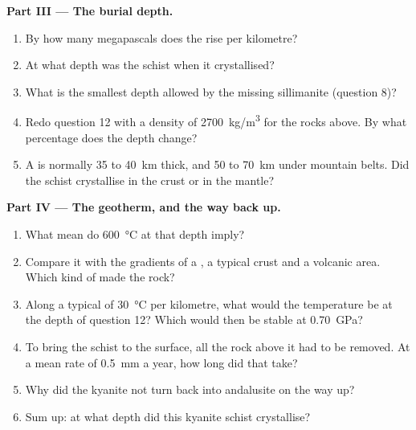 \begin{problem}
\medskip
\noindent\textbf{Part III --- The burial depth.}
\begin{enumerate}[resume]
  \item By how many megapascals does the  rise per
        kilometre?
  \item At what depth was the schist when it crystallised?
  \item What is the smallest depth allowed by the missing sillimanite
        (question 8)?
  \item Redo question 12 with a density of \qty{2700}{kg/m^3} for the rocks
        above. By what percentage does the depth change?
  \item A  is normally 35 to \qty{40}{km} thick, and 50 to
        \qty{70}{km} under mountain belts. Did the schist crystallise in the
        crust or in the mantle?
\end{enumerate}

\medskip
\noindent\textbf{Part IV --- The geotherm, and the way back up.}
\begin{enumerate}[resume]
  \item What mean  do \qty{600}{\celsius} at that depth
        imply?
  \item Compare it with the gradients of a , a typical
        crust and a volcanic area. Which kind of  made the rock?
  \item Along a typical  of \qty{30}{\celsius} per kilometre, what
        would the temperature be at the depth of question 12? Which
         would then be stable at \qty{0.70}{GPa}?
  \item To bring the schist to the surface, all the rock above it had to be
        removed. At a mean rate of \qty{0.5}{mm} a year, how long did that
        take?
  \item Why did the kyanite not turn back into andalusite on the way up?
  \item Sum up: at what depth did this kyanite schist crystallise?
\end{enumerate}
\end{problem}
